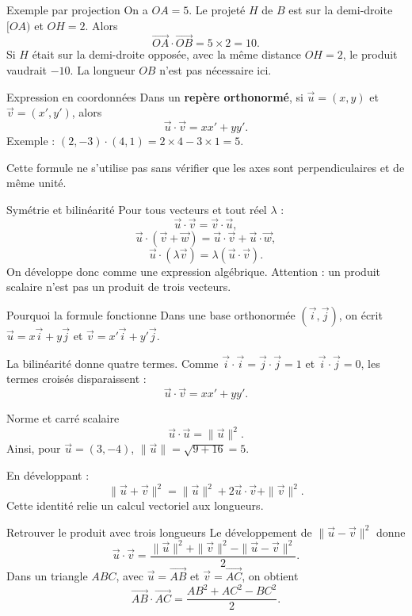 \documentclass[aspectratio=169,12pt]{beamer}
\begin{document}
\renewcommand{\slidekind}{MÉTHODE \& EXEMPLE}
\begin{frame}[t,fragile]{Exemple par projection}
On a $OA=5$. Le projeté $H$ de $B$ est sur la demi-droite $[OA)$ et $OH=2$. Alors\[\overrightarrow{OA}\cdot\overrightarrow{OB}=5\times2=10.\]Si $H$ était sur la demi-droite opposée, avec la même distance $OH=2$, le produit vaudrait $-10$. La longueur $OB$ n’est pas nécessaire ici.
\end{frame}
\renewcommand{\slidekind}{COMPRENDRE}
\begin{frame}[t,fragile]{Expression en coordonnées}
Dans un \textbf{repère orthonormé}, si $\vec u=(x,y)$ et $\vec v=(x\prime,y\prime)$, alors\[\boxed{\vec u\cdot\vec v=xx\prime+yy\prime}.\]Exemple : $(2,-3)\cdot(4,1)=2\times4-3\times1=5$.\medskip\par Cette formule ne s’utilise pas sans vérifier que les axes sont perpendiculaires et de même unité.
\end{frame}
\renewcommand{\slidekind}{COMPRENDRE}
\begin{frame}[t,fragile]{Symétrie et bilinéarité}
Pour tous vecteurs et tout réel $\lambda$ :\[\vec u\cdot\vec v=\vec v\cdot\vec u,\]\[\vec u\cdot(\vec v+\vec w)=\vec u\cdot\vec v+\vec u\cdot\vec w,\]\[\vec u\cdot(\lambda\vec v)=\lambda(\vec u\cdot\vec v).\]On développe donc comme une expression algébrique. Attention : un produit scalaire n’est pas un produit de trois vecteurs.
\end{frame}
\renewcommand{\slidekind}{JUSTIFIER}
\begin{frame}[t,fragile]{Pourquoi la formule fonctionne}
Dans une base orthonormée $(\vec i,\vec j)$, on écrit $\vec u=x\vec i+y\vec j$ et $\vec v=x\prime\vec i+y\prime\vec j$.\medskip\par La bilinéarité donne quatre termes. Comme $\vec i\cdot\vec i=\vec j\cdot\vec j=1$ et $\vec i\cdot\vec j=0$, les termes croisés disparaissent :\[\vec u\cdot\vec v=xx\prime+yy\prime.\]
\end{frame}
\renewcommand{\slidekind}{COMPRENDRE}
\begin{frame}[t,fragile]{Norme et carré scalaire}
\[\vec u\cdot\vec u=\|\vec u\|^2.\]Ainsi, pour $\vec u=(3,-4)$, $\|\vec u\|=\sqrt{9+16}=5$.\medskip\par En développant :\[\|\vec u+\vec v\|^2=\|\vec u\|^2+2\vec u\cdot\vec v+\|\vec v\|^2.\]Cette identité relie un calcul vectoriel aux longueurs.
\end{frame}
\renewcommand{\slidekind}{COMPRENDRE}
\begin{frame}[t,fragile]{Retrouver le produit avec trois longueurs}
Le développement de $\|\vec u-\vec v\|^2$ donne\[\vec u\cdot\vec v=\frac{\|\vec u\|^2+\|\vec v\|^2-\|\vec u-\vec v\|^2}{2}.\]Dans un triangle $ABC$, avec $\vec u=\overrightarrow{AB}$ et $\vec v=\overrightarrow{AC}$, on obtient\[\overrightarrow{AB}\cdot\overrightarrow{AC}=\frac{AB^2+AC^2-BC^2}{2}.\]
\end{frame}
\end{document}
